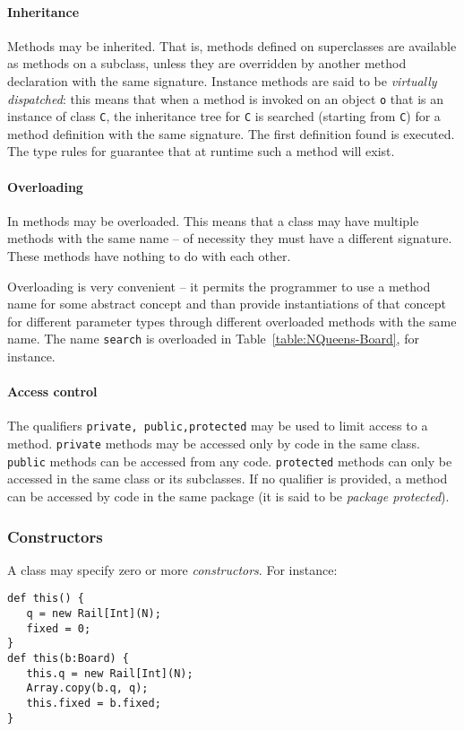 \paragraph{Inheritance}
Methods may be inherited. That is, methods defined on superclasses are
available as methods on a subclass, unless they are overridden by
another method declaration with the same signature. Instance methods
are said to be {\em virtually dispatched}: this means that when a
method is invoked on an object {\tt o} that is an instance of class
{\tt C}, the inheritance tree for {\tt C} is searched (starting from
{\tt C}) for a method definition with the same signature. The first
definition found is executed. The type rules for \Xten{} guarantee
that at runtime such a method will exist.

\paragraph{Overloading}
In \Xten{} methods may be overloaded. This means that a class may have
multiple methods with the same name -- of necessity they must have a
different signature. These methods have nothing to do with each other. 

Overloading is very convenient -- it permits the programmer to use a
method name for some abstract concept and than provide instantiations
of that concept for different parameter types through different
overloaded methods with the same name. The name {\tt search} is overloaded in 
Table~\ref{table:NQueens-Board}, for instance.

\paragraph{Access control}
The qualifiers {\tt private, public,protected} may be used to limit
access to a method. {\tt private} methods may be accessed only by code
in the same class. {\tt public} methods can be accessed from any
code. {\tt protected} methods can only be accessed in the same class
or its subclasses. If no qualifier is provided, a method can be
accessed by code in the same package (it is said to be {\em package protected}).

\subsubsection{Constructors}

A class may specify zero or more {\em constructors}. For instance:
{\footnotesize
\begin{verbatim}
def this() {
   q = new Rail[Int](N);
   fixed = 0;
}
def this(b:Board) {
   this.q = new Rail[Int](N);
   Array.copy(b.q, q);
   this.fixed = b.fixed;
}
\end{verbatim}}

